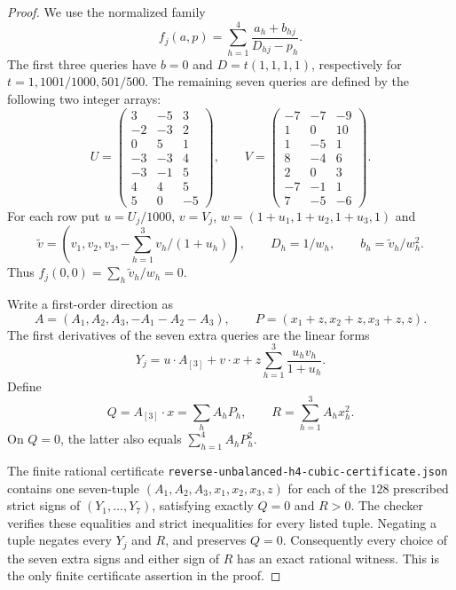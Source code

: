 \documentclass[11pt]{article}
\begin{document}
\begin{proof}
We use the normalized family
\[
 f_j(a,p)=\sum_{h=1}^4\frac{a_h+b_{hj}}{D_{hj}-p_h}.
\]
The first three queries have $b=0$ and
$D=t(1,1,1,1)$, respectively for
$t=1,1001/1000,501/500$. The remaining seven queries are defined by
the following two integer arrays:
\[
 U=\begin{pmatrix}
 3&-5&3\\-2&-3&2\\0&5&1\\-3&-3&4\\-3&-1&5\\4&4&5\\5&0&-5
 \end{pmatrix},\qquad
 V=\begin{pmatrix}
 -7&-7&-9\\1&0&10\\1&-5&1\\8&-4&6\\2&0&3\\-7&-1&1\\7&-5&-6
 \end{pmatrix}.
\]
For each row put $u=U_j/1000$, $v=V_j$,
$w=(1+u_1,1+u_2,1+u_3,1)$ and
\[
 \widetilde v=(v_1,v_2,v_3,-\sum_{h=1}^3v_h/(1+u_h)),
 \qquad D_h=1/w_h,\qquad b_h=\widetilde v_h/w_h^2.
\]
Thus $f_j(0,0)=\sum_h\widetilde v_h/w_h=0$.

Write a first-order direction as
\[
 A=(A_1,A_2,A_3,-A_1-A_2-A_3),\qquad
 P=(x_1+z,x_2+z,x_3+z,z).
\]
The first derivatives of the seven extra queries are the linear forms
\[
 Y_j=u\cdot A_{[3]}+v\cdot x+
 z\sum_{h=1}^3\frac{u_hv_h}{1+u_h}.
\]
Define
\[
 Q=A_{[3]}\cdot x=\sum_hA_hP_h,
 \qquad R=\sum_{h=1}^3 A_hx_h^2.
\]
On $Q=0$, the latter also equals $\sum_{h=1}^4A_hP_h^2$.

The finite rational certificate
\texttt{reverse-unbalanced-h4-cubic-certificate.json} contains one
seven-tuple $(A_1,A_2,A_3,x_1,x_2,x_3,z)$ for each of the $128$
prescribed strict signs of $(Y_1,\ldots,Y_7)$, satisfying exactly
$Q=0$ and $R>0$. The checker verifies these equalities and strict
inequalities for every listed tuple. Negating a tuple negates every
$Y_j$ and $R$, and preserves $Q=0$. Consequently every choice of the
seven extra signs and either sign of $R$ has an exact rational witness.
This is the only finite certificate assertion in the proof.


\end{proof}
\end{document}
